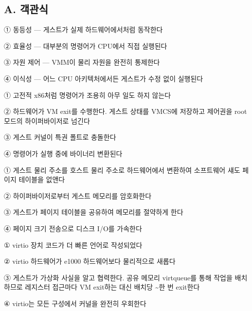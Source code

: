 
\subsection*{A. 객관식}


\begin{tbboptions}
  \item ① 동등성 — 게스트가 실제 하드웨어에서처럼 동작한다
  \item ② 효율성 — 대부분의 명령어가 CPU에서 직접 실행된다
  \item ③ 자원 제어 — VMM이 물리 자원을 완전히 통제한다
  \item ④ 이식성 — 어느 CPU 아키텍처에서든 게스트가 수정 없이 실행된다
\end{tbboptions}


\begin{tbboptions}
  \item ① 고전적 x86처럼 명령어가 조용히 아무 일도 하지 않는다
  \item ② 하드웨어가 VM exit를 수행한다. 게스트 상태를 VMCS에 저장하고 제어권을 root 모드의 하이퍼바이저로 넘긴다
  \item ③ 게스트 커널이 특권 폴트로 충돌한다
  \item ④ 명령어가 실행 중에 바이너리 변환된다
\end{tbboptions}


\begin{tbboptions}
  \item ① 게스트 물리 주소를 호스트 물리 주소로 하드웨어에서 변환하여 소프트웨어 섀도 페이지 테이블을 없앤다
  \item ② 하이퍼바이저로부터 게스트 메모리를 암호화한다
  \item ③ 게스트가 페이지 테이블을 공유하여 메모리를 절약하게 한다
  \item ④ 페이지 크기 전송으로 디스크 I/O를 가속한다
\end{tbboptions}


\begin{tbboptions}
  \item ① virtio 장치 코드가 더 빠른 언어로 작성되었다
  \item ② virtio 하드웨어가 e1000 하드웨어보다 물리적으로 새롭다
  \item ③ 게스트가 가상화 사실을 알고 협력한다. 공유 메모리 virtqueue를 통해 작업을 배치하므로 레지스터 접근마다 VM exit하는 대신 배치당 \textasciitilde{}한 번 exit한다
  \item ④ virtio는 모든 구성에서 커널을 완전히 우회한다
\end{tbboptions}

